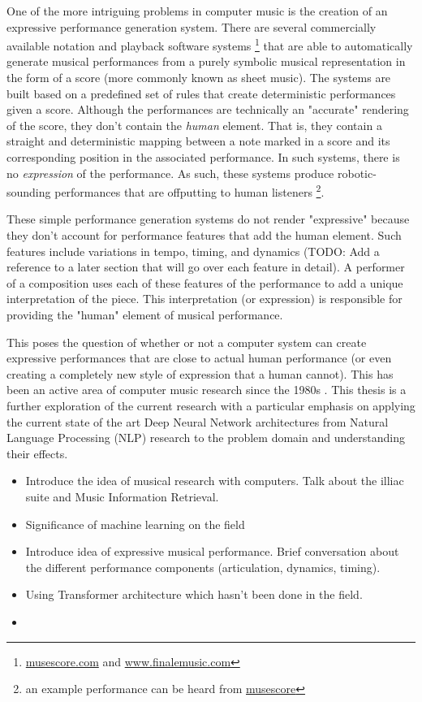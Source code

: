 One of the more intriguing problems in computer music is the creation of an expressive performance generation system. There are several commercially available notation and playback software systems \footnote{\url{musescore.com} and \url{www.finalemusic.com}} that are able to automatically generate musical performances from a purely symbolic musical representation in the form of a score (more commonly known as sheet music). The systems are built based on a predefined set of rules that create deterministic performances given a score. Although the performances are technically an "accurate" rendering of the score, they don't contain the \emph{human} element. That is, they contain a straight and deterministic mapping between a note marked in a score and its corresponding position in the associated performance. In such systems, there is no \emph{expression} of the performance. As such, these systems produce robotic-sounding performances that are offputting to human listeners \footnote{an example performance can be heard from \href{https://musescore.com/user/33884420/scores/6466906}{musescore}}. 

These simple performance generation systems do not render "expressive" because they don't account for performance features that add the human element. Such features include variations in tempo, timing, and dynamics (TODO: Add a reference to a later section that will go over each feature in detail). A performer of a composition uses each of these features of the performance to add a unique interpretation of the piece. This interpretation (or expression) is responsible for providing the "human" element of musical performance. 

This poses the question of whether or not a computer system can create expressive performances that are close to actual human performance (or even creating a completely new style of expression that a human cannot). This has been an active area of computer music research since the 1980s \cite{friberg2006overview}. This thesis is a further exploration of the current research with a particular emphasis on applying the current state of the art Deep Neural Network architectures from Natural Language Processing (NLP) research to the problem domain and understanding their effects. 

\begin{itemize}
    \item Introduce the idea of musical research with computers. Talk about the illiac suite \cite{sandred2009revisiting} and Music Information Retrieval.
    \item Significance of machine learning on the field 
    \item Introduce idea of expressive musical performance. Brief conversation about the different performance components (articulation, dynamics, timing). 
    \item Using Transformer architecture which hasn't been done in the field. 
    \item {}
\end{itemize}